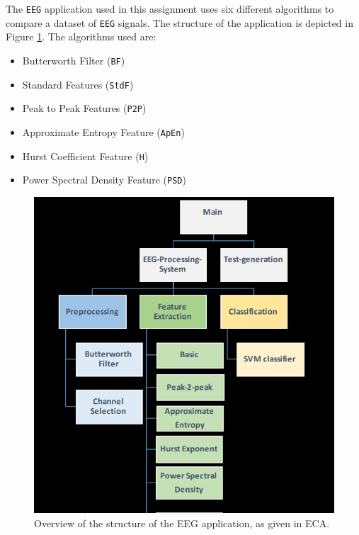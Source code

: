 \documentclass[a4paper]{article}
\begin{document}
The \texttt{EEG} application used in this assignment uses six different algorithms to compare a dataset of \texttt{EEG} signals. The structure of the application is depicted in Figure \ref{fig:eeg}. The algorithms used are:
\begin{itemize}
\item Butterworth Filter (\texttt{BF})
\item Standard Features (\texttt{StdF})
\item Peak to Peak Features (\texttt{P2P})
\item Approximate Entropy Feature (\texttt{ApEn})
\item Hurst Coefficient Feature (\texttt{H})
\item Power Spectral Density Feature (\texttt{PSD})
\end{itemize}

\begin{figure}[H]
\begin{center}
\includegraphics[scale=0.3]{images/EEG_Overview.PNG}
\caption{Overview of the structure of the EEG application, as given in ECA.}
\label{fig:eeg}
\end{center}
\end{figure}
\end{document}
